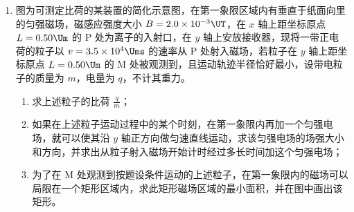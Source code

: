 \documentclass[\gkver]{gaokaozhenti}
\begin{document}
\begin{enumerate}

\item
图为可测定比荷的某装置的简化示意图，在第一象限区域内有垂直于纸面向里的匀强磁场，磁感应强度大小 $B=2.0\times10^{-3}\UT$，在 $x$ 轴上距坐标原点 $L=0.50\Um$ 的 P 处为离子的入射口，在 $y$ 轴上安放接收器，现将一带正电荷的粒子以 $v=3.5\times10^{4}\Ums$ 的速率从 P 处射入磁场，若粒子在 $y$ 轴上距坐标原点 $L=0.50\Um$ 的 M 处被观测到，且运动轨迹半径恰好最小，设带电粒子的质量为 $m$，电量为 $q$，不计其重力。

\begin{enumerate}
	\item
	求上述粒子的比荷 $\frac{q}{m}$；
	\item
	如果在上述粒子运动过程中的某个时刻，在第一象限内再加一个匀强电场，就可以使其沿 $y$ 轴正方向做匀速直线运动，求该匀强电场的场强大小和方向，并求出从粒子射入磁场开始计时经过多长时间加这个匀强电场；
	\item
	为了在 M 处观测到按题设条件运动的上述粒子，在第一象限内的磁场可以局限在一个矩形区域内，求此矩形磁场区域的最小面积，并在图中画出该矩形。
\end{enumerate}


\end{enumerate}
\end{document}
